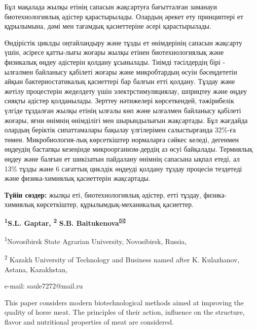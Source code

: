 Бұл мақалада жылқы етінің сапасын жақсартуға бағытталған заманауи
биотехнологиялық әдістер қарастырылады. Олардың әрекет ету принциптері
ет құрылымына, дәмі мен тағамдық қасиеттеріне әсері қарастырылады.

Өндірістік циклды оңтайландыру және тұзды ет өнімдерінің сапасын
жақсарту үшін, әсіресе қатты-лығы жоғары жылқы етінен биотехнологиялық
және физикалық өңдеу әдістерін қолдану ұсынылады. Тиімді тәсілдердің
бірі - ылғалмен байланысу қабілеті жоғары және микробтардың өсуін
бәсеңдететін айқын бактериостатикалық қасиеттері бар балғын етті
қолдану. Тұздау және жетілу процестерін жеделдету үшін
электрстимуляциялау, шприцтеу және өңдеу сияқты әдістер қолданылады.
Зерттеу нәтижелері көрсеткендей, тәжірибелік үлгіде тұздалған жылқы
етінің ылғалы көп және ылғалмен байланысу қабілеті жоғары, яғни өнімнің
өнімділігі мен шырындылығын жақсартады. Бұл жағдайда олардың беріктік
сипаттамалары бақылау үлгілерімен салыстырғанда 32\%-ға төмен.
Микробиология-лық көрсеткіштер нормаларға сәйкес келеді, дегенмен
өңдеудің бастапқы кезеңінде микроорганизм-дердің аз өсуі байқалады.
Термиялық өңдеу және балғын ет шикізатын пайдалану өнімнің сапасына
ықпал етеді, ал 13\% тұзды және 6 сағаттық циклдік өңдеуді қолдану
тұздау процесін тездетеді және физика-химиялық қасиеттерін жақсартады.

{\bfseries Түйін сөздер:} жылқы еті, биотехнологиялық әдістер, етті тұздау,
физика-химиялық көрсеткіштер, құрылымдық-механикалық қасиеттер.

\begin{center}

{\bfseries \textsuperscript{1}S.L. Gaptar, \textsuperscript{2}}
{\bfseries S.B. Baitukenova\textsuperscript{🖂}}

\textsuperscript{1}Novosibirsk State Agrarian University, Novosibirsk,
Russia,

\textsuperscript{2} Kazakh University of Technology and Business named
after K. Kulazhanov, Astana, Kazakhstan,

e-mail: saule7272@mail.ru
\end{center}

This paper considers modern biotechnological methods aimed at improving
the quality of horse meat. The principles of their action, influence on
the structure, flavor and nutritional properties of meat are considered.

